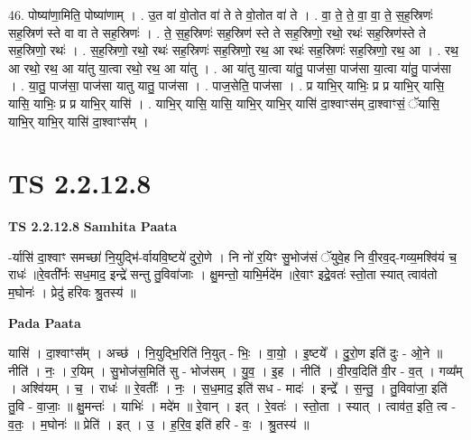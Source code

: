 \documentclass[17pt]{extarticle}
\begin{document}
46. पोष्या॑णा॒मिति॒ पोष्या॑णाम् । . उ॒त वा॑ वो॒तोत वा॑ ते ते वो॒तोत वा॑ ते । . वा॒ ते॒ ते॒ वा॒ वा॒ ते॒ स॒ह॒स्रिणः॑ सह॒स्रिण॑ स्ते वा वा ते सह॒स्रिणः॑ । . ते॒ स॒ह॒स्रिणः॑ सह॒स्रिण॑ स्ते ते सह॒स्रिणो॒ रथो॒ रथः॑ सह॒स्रिण॑स्ते ते सह॒स्रिणो॒ रथः॑ । . स॒ह॒स्रिणो॒ रथो॒ रथः॑ सह॒स्रिणः॑ सह॒स्रिणो॒ रथ॒ आ रथः॑ सह॒स्रिणः॑ सह॒स्रिणो॒ रथ॒ आ । . रथ॒ आ रथो॒ रथ॒ आ या॑तु या॒त्वा रथो॒ रथ॒ आ या॑तु । . आ या॑तु या॒त्वा या॑तु॒ पाज॑सा॒ पाज॑सा या॒त्वा या॑तु॒ पाज॑सा । . या॒तु॒ पाज॑सा॒ पाज॑सा यातु यातु॒ पाज॑सा । . पाज॒सेति॒ पाज॑सा । . प्र याभि॒र् याभिः॒ प्र प्र याभि॒र् यासि॒ यासि॒ याभिः॒ प्र प्र याभि॒र् यासि॑ । . याभि॒र् यासि॒ यासि॒ याभि॒र् याभि॒र् यासि॑ दा॒श्वाꣳस॑म् दा॒श्वाꣳसं॒ ॅयासि॒ याभि॒र् याभि॒र् यासि॑ दा॒श्वाꣳस᳚म् । \newline
\pagebreak
{}

\section{ TS 2.2.12.8 }

\textbf{TS 2.2.12.8 } \newline
\textbf{Samhita Paata} \newline

-र्यासि॑ दा॒श्वाꣳ समच्छा॑ नि॒युद्भि॑-र्वायवि॒ष्टये॑ दुरो॒णे । नि नो॑ र॒यिꣳ सु॒भोज॑सं ॅयुवे॒ह नि वी॒रव॒द्-गव्य॒मश्वि॑यं च॒ राधः॑ ॥रे॒वती᳚र्नः सध॒माद॒ इन्द्रे॑ सन्तु तु॒विवा॑जाः । क्षु॒मन्तो॒ याभि॒र्मदे॑म ॥रे॒वाꣳ इद्रे॒वतः॑ स्तो॒ता स्यात् त्वाव॑तो म॒घोनः॑ । प्रेदु॑ हरिवः श्रु॒तस्य॑ ॥ \newline

\textbf{Pada Paata} \newline

यासि॑ । दा॒श्वाꣳस᳚म् । अच्छ॑ । नि॒युद्भि॒रिति॑ नि॒युत् - भिः॒ । वा॒यो॒ । इ॒ष्टये᳚ । दु॒रो॒ण इति॑ दुः - ओ॒ने ॥ नीति॑ । नः॒ । र॒यिम् । सु॒भोज॑स॒मिति॑ सु - भोज॑सम् । यु॒व॒ । इ॒ह । नीति॑ । वी॒रव॒दिति॑ वी॒र - व॒त् । गव्य᳚म् । अश्वि॑यम् । च॒ । राधः॑ ॥ रे॒वतीः᳚ । नः॒ । स॒ध॒माद॒ इति॑ सध - मादः॑ । इन्द्रे᳚ । स॒न्तु॒ । तु॒विवा॑जा॒ इति॑ तु॒वि - वा॒जाः॒ ॥ क्षु॒मन्तः॑ । याभिः॑ । मदे॑म ॥ रे॒वान् । इत् । रे॒वतः॑ । स्तो॒ता । स्यात् । त्वाव॑त॒ इति॒ त्व - व॒तः॒ । म॒घोनः॑ ॥ प्रेति॑ । इत् । उ॒ । ह॒रि॒व॒ इति॑ हरि - वः॒ । श्रु॒तस्य॑ ॥  \newline
\end{document}
